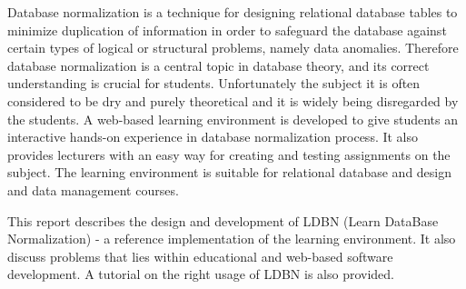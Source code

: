 Database normalization is a technique for designing relational database tables 
to minimize duplication of information in order to safeguard the database 
against certain types of logical or structural problems, namely data anomalies. 
Therefore database normalization is a central topic in database theory, and its 
correct understanding is crucial for students. Unfortunately  the subject it is 
often considered to be dry and purely theoretical and it is widely being disregarded 
by the students. A web-based learning environment is developed to give 
students an interactive hands-on experience in database normalization process. It
also provides lecturers with an easy way for creating and testing assignments 
on the subject.  
The learning environment is suitable for relational database and design and data 
management courses. 

This report describes the design and development of LDBN 
(Learn DataBase Normalization) - a reference implementation of the learning environment.
It also discuss problems that lies within educational and web-based software development.
A tutorial on the right usage of LDBN is also provided.   

